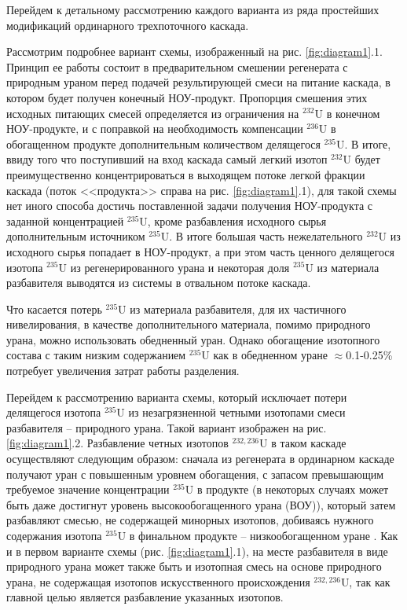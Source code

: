 Перейдем к детальному рассмотрению каждого варианта из ряда простейших модификаций ординарного трехпоточного каскада.

Рассмотрим подробнее вариант схемы, изображенный на рис. \ref{fig:diagram1}.1. Принцип ее работы состоит в предварительном смешении регенерата с природным ураном перед подачей результирующей смеси на питание каскада, в котором будет получен конечный НОУ-продукт. Пропорция смешения этих исходных питающих смесей определяется из ограничения на $^{232}$U в конечном НОУ-продукте, и с поправкой на необходимость компенсации $^{236}$U в обогащенном продукте дополнительным количеством делящегося $^{235}$U. В итоге, ввиду того что поступивший на вход каскада самый легкий изотоп $^{232}$U будет преимущественно концентрироваться в выходящем потоке легкой фракции каскада (поток <<продукта>> справа на рис. \ref{fig:diagram1}.1), для такой схемы нет иного способа достичь поставленной задачи получения НОУ-продукта с заданной концентрацией $^{235}$U, кроме разбавления исходного сырья дополнительным источником $^{235}$U. В итоге большая часть нежелательного $^{232}$U из исходного сырья попадает в НОУ-продукт, а при этом часть ценного делящегося изотопа $^{235}$U из регенерированного урана и некоторая доля $^{235}$U из материала разбавителя выводятся из системы в отвальном потоке каскада.

Что касается потерь $^{235}$U из материала разбавителя, для их частичного нивелирования, в качестве дополнительного материала, помимо природного урана, можно использовать обедненный уран. Однако обогащение  изотопного состава с таким низким содержанием $^{235}$U как в обедненном уране $\approx$0.1-0.25\% потребует увеличения затрат работы разделения.

Перейдем к рассмотрению варианта схемы, который исключает потери делящегося изотопа $^{235}$U из незагрязненной четными изотопами смеси разбавителя -- природного урана. Такой вариант изображен на рис. \ref{fig:diagram1}.2. Разбавление четных изотопов $^{232,236}$U в таком каскаде осуществляют следующим образом: сначала из регенерата в ординарном каскаде получают уран с повышенным уровнем обогащения, с запасом превышающим требуемое значение концентрации $^{235}$U в продукте (в некоторых случаях может быть даже достигнут уровень высокообогащенного урана (ВОУ)), который затем разбавляют смесью, не содержащей минорных изотопов, добиваясь нужного содержания изотопа $^{235}$U в финальном продукте -- низкообогащенном уране \cite{SposobIzotopnogoVosstanovleniyaa}. Как и в первом варианте схемы (рис. \ref{fig:diagram1}.1), на месте разбавителя в виде природного урана может также быть и изотопная смесь на основе природного урана, не содержащая изотопов искусственного происхождения $^{232,236}$U, так как главной целью является разбавление указанных изотопов.

